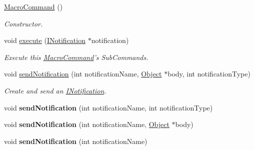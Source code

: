 \begin{DoxyCompactItemize}
\item 
\hyperlink{class_pure_m_v_c_1_1_macro_command_abf91c7c1114f20b006cf95bf8c4614e7}{MacroCommand} ()
\begin{DoxyCompactList}\small\item\em Constructor. \item\end{DoxyCompactList}\item 
void \hyperlink{class_pure_m_v_c_1_1_macro_command_a23d3bdc5519b108646e1b169e5eaa219}{execute} (\hyperlink{class_pure_m_v_c_1_1_i_notification}{INotification} $\ast$notification)
\begin{DoxyCompactList}\small\item\em Execute this {\ttfamily \hyperlink{class_pure_m_v_c_1_1_macro_command}{MacroCommand}}'s {\itshape SubCommands\/}. \item\end{DoxyCompactList}\item 
void \hyperlink{class_pure_m_v_c_1_1_notifier_a55a358ee2661ecc08400653016fdb497}{sendNotification} (int notificationName, \hyperlink{class_pure_m_v_c_1_1_object}{Object} $\ast$body, int notificationType)
\begin{DoxyCompactList}\small\item\em Create and send an {\ttfamily \hyperlink{class_pure_m_v_c_1_1_i_notification}{INotification}}. \item\end{DoxyCompactList}\item 
\hypertarget{class_pure_m_v_c_1_1_notifier_a6fa2ef42750287b410dcdd867479450b}{
void {\bfseries sendNotification} (int notificationName, int notificationType)}
\label{class_pure_m_v_c_1_1_notifier_a6fa2ef42750287b410dcdd867479450b}

\item 
\hypertarget{class_pure_m_v_c_1_1_notifier_a79a17268f222d42c1cc1f41a13da3b62}{
void {\bfseries sendNotification} (int notificationName, \hyperlink{class_pure_m_v_c_1_1_object}{Object} $\ast$body)}
\label{class_pure_m_v_c_1_1_notifier_a79a17268f222d42c1cc1f41a13da3b62}

\item 
\hypertarget{class_pure_m_v_c_1_1_notifier_a012642026e913c8e30d006e2e8f869c6}{
void {\bfseries sendNotification} (int notificationName)}
\label{class_pure_m_v_c_1_1_notifier_a012642026e913c8e30d006e2e8f869c6}


\end{DoxyCompactItemize}
